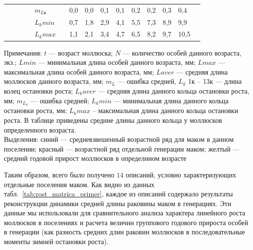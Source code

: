 \begin{table}[p]
\begin{tabularx}{\textwidth}{|X|X|XX|XX|XXXXXXXXX|}
                &    &       &       & $m_{Lк}$      &  & 0,0 & 0,0 & 0,1 & 0,1 & 0,2 & 0,2 & 0,3 & 0,4  &      \\
                &    &       &       & $L_{k} min$  &   & 0,7 & 1,8 & 2,9 & 4,1 & 5,5 & 7,3 & 8,9 & 9,9  &      \\
                &    &       &       &  $L_{k} max$ &   & 1,1 & 2,1 & 3,4 & 4,7 & 6,5 & 8,2 & 9,7 & 10,5 &     \\ \hline
    \end{tabularx}
    \footnotesize{Примечания: $t$ --- возраст моллюска; 
        $N$ --- количество  особей  данного возраста, экз.; 
        $L min$  ---  минимальная   длина  особей   данного   возраста,   мм;   
        $L max$   ---   максимальная   длина   особей   данного   возраста,   мм; 
        $L aver$ --- средняя длина моллюсков данного возраста, мм; 
        $m_L$ --- ошибка средней, 
        $L_k$ 1к -- 13к --- длина колец остановки роста;
        $L_k aver$ --- средняя длина данного кольца остановки роста, мм; 
        $m_{L_k}$ --- ошибка средней; 
        $L_k min$ --- минимальная длина данного кольца остановки роста, мм; 
        $L_k   max$   --   максимальная   длина   данного   кольца   остановки   роста.   
        В   таблице   приведены средние длины данного кольца у моллюсков определенного возраста. \\[1em]
    Выделения: синий --- средневзвешенный возрастной ряд для маком в данном поселении;
        красный --- возрастной ряд отдельной генерации маком;
        желтый --- средний годовой прирост моллюсков в определнном возрасте}
\end{table}
Таким образом, всего было получено $14$ описаний, условно характеризующих отдельные поселения маком. 
Как видно из данных табл.~\ref{tab:rost_matrica_primer}, каждое из описаний содержало результаты реконструкции динамики средней длины раковины маком в генерациях. 
Эти данные мы использовали для сравнительного анализа характера линейного роста моллюсков в поселениях и расчета величин группового годового прироста особей в генерации (как разность средних длин раковин моллюсков в последовательные моменты зимней остановки роста).

